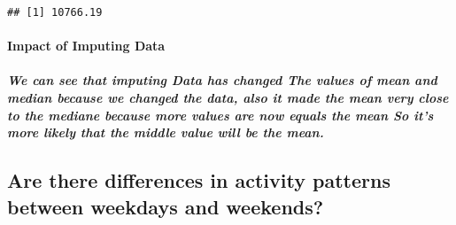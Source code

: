 \documentclass[
]{article}
\newenvironment{Shaded}{\begin{snugshade}}{\end{snugshade}}
\newcommand{\FunctionTok}[1]{\textcolor[rgb]{0.00,0.00,0.00}{#1}}
\newcommand{\NormalTok}[1]{#1}
\newcommand{\SpecialCharTok}[1]{\textcolor[rgb]{0.00,0.00,0.00}{#1}}
\begin{document}
\begin{Shaded}
\end{Shaded}

\begin{verbatim}
## [1] 10766.19
\end{verbatim}

\hypertarget{impact-of-imputing-data}{%
\paragraph{Impact of Imputing Data}\label{impact-of-imputing-data}}

\hypertarget{we-can-see-that-imputing-data-has-changed-the-values-of-mean-and-median-because-we-changed-the-data-also-it-made-the-mean-very-close-to-the-mediane-because-more-values-are-now-equals-the-mean-so-its-more-likely-that-the-middle-value-will-be-the-mean.}{%
\subparagraph{We can see that imputing Data has changed The values of
mean and median because we changed the data, also it made the mean very
close to the mediane because more values are now equals the mean So it's
more likely that the middle value will be the
mean.}\label{we-can-see-that-imputing-data-has-changed-the-values-of-mean-and-median-because-we-changed-the-data-also-it-made-the-mean-very-close-to-the-mediane-because-more-values-are-now-equals-the-mean-so-its-more-likely-that-the-middle-value-will-be-the-mean.}}

\hypertarget{are-there-differences-in-activity-patterns-between-weekdays-and-weekends}{%
\subsection{Are there differences in activity patterns between weekdays
and
weekends?}\label{are-there-differences-in-activity-patterns-between-weekdays-and-weekends}}
\end{document}
